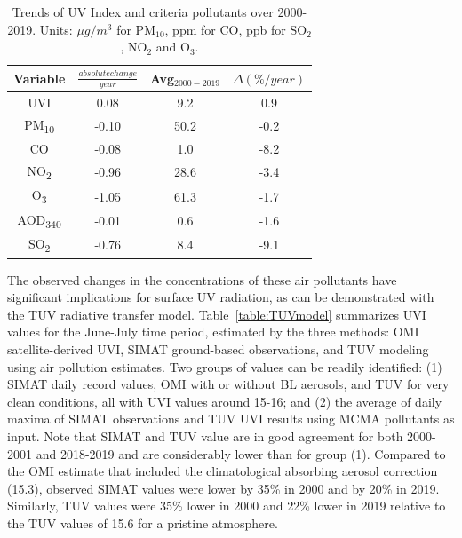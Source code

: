 \documentclass[journal=jacsat,manuscript=article]{achemso}
\begin{document}
\begin{table}[H]
  \centering
  \begin{tabular}{cccc} \hline
    Variable               & $\frac{absolute change}{year}$ & Avg$_{2000-2019}$ & $\Delta(\%/year)$ \\ \hline
    UVI                    & 0.08                           & 9.2               & 0.9               \\
    PM\textsubscript{10}   & -0.10                          & 50.2              & -0.2              \\
    CO                     & -0.08                          & 1.0               & -8.2              \\
    NO\textsubscript{2}    & -0.96                          & 28.6              & -3.4              \\
    O\textsubscript{3}     & -1.05                          & 61.3              & -1.7              \\
    AOD\textsubscript{340} & -0.01                          & 0.6               & -1.6              \\
    SO\textsubscript{2}    & -0.76                          & 8.4               & -9.1              \\
    \hline
  \end{tabular}
  \caption{{{{Trends of UV Index and criteria pollutants over 2000-2019.
                Units: $\mu g/m^3$ for PM$_{10}$, ppm for CO, ppb for SO$_2$, NO$_2$ and O$_3$.}}}}
  \label{table:uvindex}
\end{table}

The observed changes in the concentrations of these air pollutants have
significant implications for surface UV radiation, as can be
demonstrated with the TUV radiative transfer model.
Table~{\ref{table:TUVmodel}} summarizes UVI values for
the June-July time period, estimated by the three methods: OMI
satellite-derived UVI, SIMAT ground-based observations, and TUV modeling
using air pollution estimates. Two groups of values can be readily
identified: (1) SIMAT daily record values, OMI with or without BL
aerosols, and TUV for very clean conditions, all with UVI values around
15-16; and (2) the average of daily maxima of SIMAT observations and TUV UVI results using
MCMA pollutants as input. Note that SIMAT and TUV value are in good agreement
for both 2000-2001 and 2018-2019 and are considerably lower than for group (1). Compared to the OMI
estimate that included the climatological absorbing aerosol correction (15.3),
observed SIMAT values were lower by 35\% in 2000 and by 20\% in 2019.
Similarly, TUV values were 35\% lower in 2000 and 22\% lower in 2019
relative to the TUV values of 15.6 for a pristine atmosphere.
\end{document}
